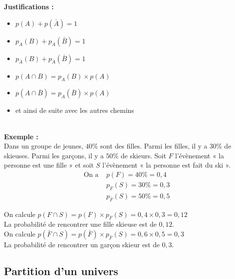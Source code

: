 \documentclass{article}
\begin{document}
\textbf{Justifications :}

\begin{minipage}[t]{0.4\textwidth}
  \begin{itemize}
    \item $p(A)+p(\bar A)=1$
    \item $p_A(B)+p_A(\bar B)=1$
    \item $p_{\bar A}(B)+p_{\bar A}(\bar B)=1$
  \end{itemize}
\end{minipage}
\hfill
\begin{minipage}[t]{0.6\textwidth}
  \begin{itemize}
    \item $p(A\cap B)=p_A(B)\times p(A)$
    \item $p(A\cap \bar B)=p_A(\bar B)\times p(A)$
    \item et ainsi de suite avec les autres chemins
  \end{itemize}
\end{minipage} ~\\

\textbf{Exemple :} ~\\
Dans un groupe de jeunes, $40\%$ sont des filles. Parmi les filles, il y a $30\%$ de skieuses. Parmi les garçons, il y a $50\%$ de skieurs.
Soit $F$ l'évènement « la personne est une fille » et soit $S$ l'évènement « la personne est fait du ski ».
\begin{equation*}
  \begin{split}
    \text{On a }&p(F)=40\%=0,4\\
    &p_F(S)=30\%=0,3 \\
    &p_{\bar{F}}(S)=50\%=0,5
  \end{split}
\end{equation*}

On calcule $p(F\cap S)=p(F)\times p_F(S)=0,4\times0,3=0,12$ \\
La probabilité de rencontrer une fille skieuse est de $0,12$. \\

On calcule $p(\bar F\cap S)=p(\bar F)\times p_{\bar{F}}(S)=0,6\times0,5=0,3$ \\
La probabilité de rencontrer un garçon skieur est de $0,3$.

\subsection{Partition d'un univers}
\end{document}
